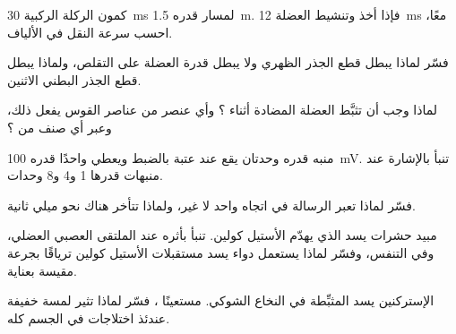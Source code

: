 \begin{exercise}[$\star\star$]\label{exo:g12:stretch-reflex:7}
كمون الركلة الركبية \qty{30}{ms} لمسار قدره \qty{1.5}{m}. فإذا أخذ
 وتنشيط العضلة \qty{12}{ms} معًا، احسب سرعة النقل في الألياف.
\end{exercise}

\begin{exercise}[$\star\star$]\label{exo:g12:stretch-reflex:8}
فسّر لماذا يبطل قطع الجذر الظهري  ولا يبطل قدرة العضلة على
التقلص، ولماذا يبطل قطع الجذر البطني الاثنين.
\end{exercise}

\begin{exercise}[$\star\star$]\label{exo:g12:stretch-reflex:9}
لماذا وجب أن تثبَّط العضلة المضادة أثناء ؟ وأي عنصر من عناصر
القوس يفعل ذلك، وعبر أي صنف من ؟
\end{exercise}

\begin{exercise}[$\star\star$]\label{exo:g12:stretch-reflex:10}
منبه قدره وحدتان يقع عند عتبة  بالضبط ويعطي  واحدًا قدره
\qty{100}{mV}. تنبأ بالإشارة عند منبهات قدرها 1 و4 و8 وحدات.
\end{exercise}

\begin{exercise}[$\star\star$]\label{exo:g12:stretch-reflex:11}
فسّر لماذا تعبر الرسالة  في اتجاه واحد لا غير، ولماذا تتأخر هناك
نحو ميلي ثانية.
\end{exercise}

\begin{exercise}[$\star\star\star$]\label{exo:g12:stretch-reflex:12}
مبيد حشرات يسد  الذي يهدّم الأستيل كولين. تنبأ بأثره عند الملتقى
العصبي العضلي، وفي التنفس، وفسّر لماذا يستعمل دواء يسد مستقبلات
الأستيل كولين ترياقًا بجرعة مقيسة بعناية.
\end{exercise}

\begin{exercise}[$\star\star\star$]\label{exo:g12:stretch-reflex:13}
الإستركنين يسد  المثبِّطة في النخاع الشوكي. مستعينًا ، فسّر لماذا تثير لمسة خفيفة عندئذ اختلاجات في الجسم كله.
\end{exercise}

